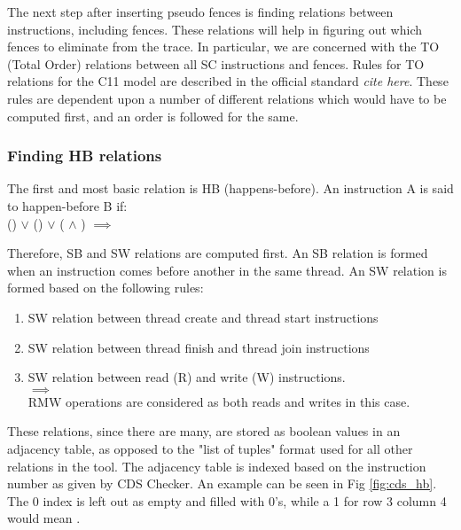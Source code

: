 \par
The next step after inserting pseudo fences is finding relations between instructions, including fences. These relations will help in figuring out which fences to eliminate from the trace. In particular, we are concerned with the TO (Total Order) relations between all SC instructions and fences. Rules for TO relations for the C11 model are described in the official standard \textit{\color{pink}cite here}. These rules are dependent upon a number of different relations which would have to be computed first, and an order is followed for the same.

\subsubsection{Finding HB relations}
The first and most basic relation is HB (happens-before). An instruction A is said to happen-before B if:\\
() $\lor$ () $\lor$ ( $\land$ ) $\implies$ 

\par
Therefore, SB and SW relations are computed first. An SB relation is formed when an instruction comes before another in the same thread. An SW relation is formed based on the following rules:
\begin{enumerate}
\item SW relation between thread create and thread start instructions\\

\item SW relation between thread finish and thread join instructions\\

\item SW relation between read (R) and write (W) instructions.\\
 $\implies$ \\
RMW operations are considered as both reads and writes in this case.
\end{enumerate}

\par
These relations, since there are many, are stored as boolean values in an adjacency table, as opposed to the "list of tuples" format used for all other relations in the tool. The adjacency table is indexed based on the instruction number as given by CDS Checker. An example can be seen in Fig \ref{fig:cds_hb}. The 0 index is left out as empty and filled with 0's, while a 1 for row 3 column 4 would mean .

